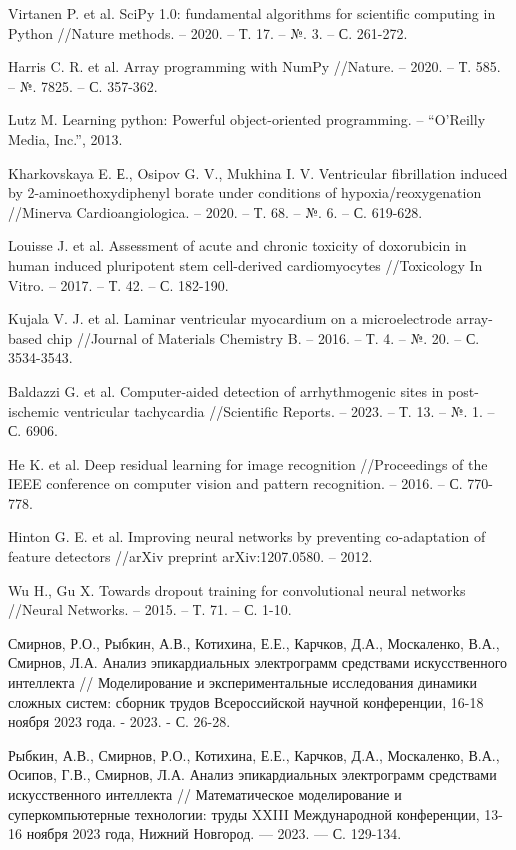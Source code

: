 \begin{thebibliography}{00}
	Virtanen P. et al. SciPy 1.0: fundamental algorithms for scientific
	computing in Python //Nature methods. – 2020. – Т. 17. – №. 3. – С.
	261-272.

	Harris C. R. et al. Array programming with NumPy //Nature. – 2020. – Т.
	585. – №. 7825. – С. 357-362.

	Lutz M. Learning python: Powerful object-oriented programming. – ``O'Reilly
	Media, Inc.'', 2013.

	Kharkovskaya E. Е., Osipov G. V., Mukhina I. V. Ventricular fibrillation
	induced by 2-aminoethoxydiphenyl borate under conditions of
	hypoxia/reoxygenation //Minerva Cardioangiologica. – 2020. – Т. 68. – №. 6.
	– С. 619-628.

	Louisse J. et al. Assessment of acute and chronic toxicity of doxorubicin
	in human induced pluripotent stem cell-derived cardiomyocytes //Toxicology
	In Vitro. – 2017. – Т. 42. – С. 182-190.

	Kujala V. J. et al. Laminar ventricular myocardium on a microelectrode
	array-based chip //Journal of Materials Chemistry B. – 2016. – Т. 4. – №.
	20. – С. 3534-3543.

	Baldazzi G. et al. Computer-aided detection of arrhythmogenic sites in
	post-ischemic ventricular tachycardia //Scientific Reports. – 2023. – Т.
	13. – №. 1. – С. 6906.

	He K. et al. Deep residual learning for image recognition //Proceedings of
	the IEEE conference on computer vision and pattern recognition. – 2016. –
	С. 770-778.

	Hinton G. E. et al. Improving neural networks by preventing co-adaptation
	of feature detectors //arXiv preprint arXiv:1207.0580. – 2012.

	Wu H., Gu X. Towards dropout training for convolutional neural networks
	//Neural Networks. – 2015. – Т. 71. – С. 1-10.

	Смирнов, Р.О., Рыбкин, А.В., Котихина, Е.Е., Карчков, Д.А., Москаленко,
	В.А., Смирнов, Л.А. Анализ эпикардиальных электрограмм средствами
	искусственного интеллекта // Моделирование и экспериментальные исследования
	динамики сложных систем: сборник трудов Всероссийской научной конференции,
	16-18 ноября 2023 года. - 2023. - С. 26-28.

	Рыбкин, А.В., Смирнов, Р.О., Котихина, Е.Е., Карчков, Д.А., Москаленко, В.А.,
	Осипов, Г.В., Смирнов, Л.А. Анализ эпикардиальных электрограмм средствами
	искусственного интеллекта // Математическое моделирование и суперкомпьютерные
	технологии: труды XXIII Международной конференции, 13-16 ноября 2023 года,
	Нижний Новгород. — 2023. — С. 129-134.


\end{thebibliography}
